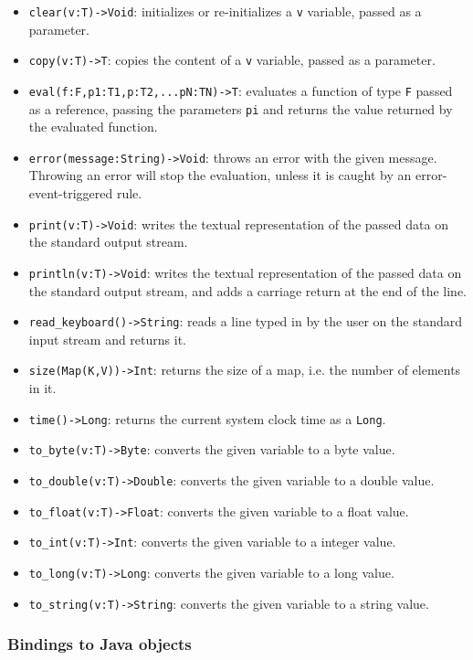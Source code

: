 \documentclass[11pt]{article}
\begin{document}
\begin{itemize}
\item \texttt{clear(v:T)->Void}: initializes or re-initializes a \texttt{v} variable, passed as a parameter.
\item \texttt{copy(v:T)->T}: copies the content of a \texttt{v} variable, passed as a parameter.
\item \texttt{eval(f:F,p1:T1,p:T2,...pN:TN)->T}: evaluates a function of type \texttt{F} passed as a reference, passing the parameters \texttt{pi} and returns the value returned by the evaluated function.
\item \texttt{error(message:String)->Void}: throws an error with the given message. Throwing an error will stop the evaluation, unless it is caught by an error-event-triggered rule.
\item \texttt{print(v:T)->Void}: writes the textual representation of the passed data on the standard output stream.
\item \texttt{println(v:T)->Void}: writes the textual representation of the passed data on the standard output stream, and adds a carriage return at the end of the line.
\item \texttt{read\_keyboard()->String}: reads a line typed in by the user on the standard input stream and returns it.
\item \texttt{size(Map(K,V))->Int}: returns the size of a map, i.e. the number of elements in it.
\item \texttt{time()->Long}: returns the current system clock time as a \texttt{Long}.
\item \texttt{to\_byte(v:T)->Byte}: converts the given variable to a byte value.
\item \texttt{to\_double(v:T)->Double}: converts the given variable to a double value.
\item \texttt{to\_float(v:T)->Float}: converts the given variable to a float value.
\item \texttt{to\_int(v:T)->Int}: converts the given variable to a integer value.
\item \texttt{to\_long(v:T)->Long}: converts the given variable to a long value.
\item \texttt{to\_string(v:T)->String}: converts the given variable to a string value.
\end{itemize}

\subsubsection{Bindings to Java objects\label{sec:bindings}}
\end{document}
